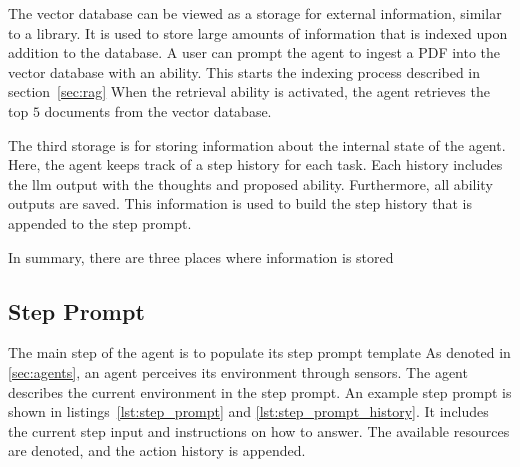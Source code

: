 \documentclass[../main.tex]{subfiles}
\begin{document}
The vector database can be viewed as a storage for external information,
similar to a library.
It is used to store large amounts of information that is indexed upon addition
to the database.
A user can prompt the agent to ingest a PDF into the vector database with an ability.
This starts the indexing process described in section~\ref{sec:rag}
When the retrieval ability is activated, the agent retrieves the top $5$ documents
from the vector database.

The third storage is for storing information about the internal state of the agent.
Here, the agent keeps track of a step history for each task.
Each history includes the \gls{llm} output with the thoughts and proposed ability.
Furthermore, all ability outputs are saved.
This information is used to build the step history that is appended to the step prompt.

In summary, there are three places where information is stored

\subsection{Step Prompt}





The main step of the agent is to populate its step prompt template
As denoted in \autoref{sec:agents}, an agent perceives its environment through sensors.
The agent describes the current environment in the step prompt.
An example step prompt is shown in listings~\ref{lst:step_prompt} and \ref{lst:step_prompt_history}.
It includes the current step input and instructions on how to answer.
The available resources are denoted, and the action history is appended.
\end{document}

